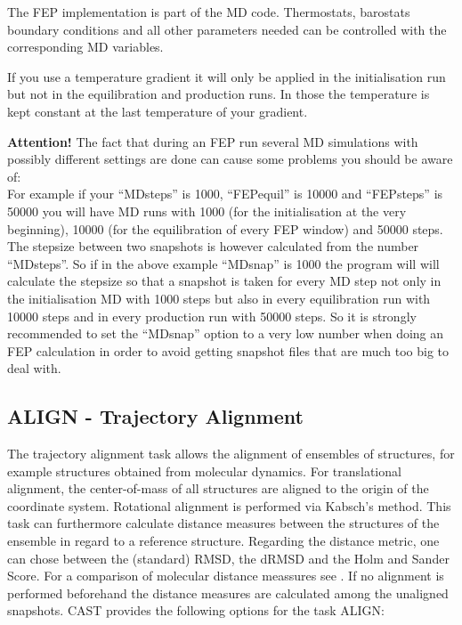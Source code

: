 \documentclass[10pt,a4paper]{article} %
\begin{document}
	The \ac{FEP} implementation is part of the \ac{MD} code. Thermostats, barostats boundary conditions and all other parameters needed can be controlled with the corresponding \ac{MD} variables.
	
	If you use a temperature gradient it will only be applied in the initialisation run but not in the equilibration and production runs. In those the temperature is kept constant at the last temperature of your gradient.
	
\textbf{Attention!} The fact that during an FEP run several MD simulations with possibly different settings are done can cause some problems you should be aware of: \\
For example if your ``MDsteps'' is 1000, ``FEPequil'' is 10000 and ``FEPsteps'' is 50000 you will have MD runs with 1000 (for the initialisation at the very beginning), 10000 (for the equilibration of every FEP window) and 50000 steps. The stepsize between two snapshots is however calculated from the number ``MDsteps''. So if in the above example ``MDsnap'' is 1000 the program will will calculate the stepsize so that a snapshot is taken for every MD step not only in the initialisation MD with 1000 steps but also in every equilibration run with 10000 steps and in every production run with 50000 steps. So it is strongly recommended to set the ``MDsnap'' option to a very low number when doing an FEP calculation in order to avoid getting snapshot files that are much too big to deal with. \\

	
	\subsection{ALIGN - Trajectory Alignment}
	\label{sec:align}
	The trajectory alignment task allows the alignment of ensembles of structures, for example structures obtained from molecular dynamics. For translational alignment, the center-of-mass of all structures are aligned to the origin of the coordinate system. Rotational alignment is performed via Kabsch's method\supercite{kabsch1, kabsch2}. This task can furthermore calculate distance measures between the structures of the ensemble in regard to a reference structure. Regarding the distance metric, one can chose between the (standard) \ac{RMSD}, the \ac{dRMSD} and the Holm and Sander Score\supercite{holmsander}. For a comparison of molecular distance meassures see \cite{distancemeasures}. If no alignment is performed beforehand the distance measures are calculated among the unaligned snapshots. \ac{CAST} provides the following options for the task ALIGN: \\~\\
	
\end{document}
